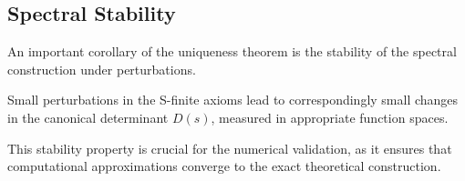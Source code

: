 \subsection{Spectral Stability}

An important corollary of the uniqueness theorem is the stability of the spectral construction under perturbations.

\begin{corollary}[Stability]
Small perturbations in the S-finite axioms lead to correspondingly small changes in the canonical determinant \( D(s) \), measured in appropriate function spaces.
\end{corollary}

This stability property is crucial for the numerical validation, as it ensures that computational approximations converge to the exact theoretical construction.
